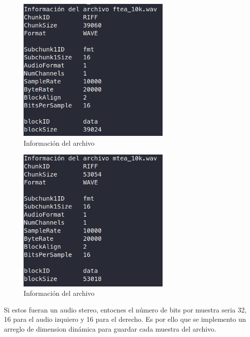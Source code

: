 \begin{minipage}{8.2cm}
    \begin{figure}[H]
        \centering
        \includegraphics[width=7.5cm]{Graphics/ftea_10k_information.png}
        \caption{Información del archivo }
        \label{fig:ftea_information}
    \end{figure}
\end{minipage}
\hspace{0.5cm}
\begin{minipage}{8.2cm}
    \begin{figure}[H]
        \centering
        \includegraphics[width=7.5cm]{Graphics/mtea_10k_information.png}
        \caption{Información del archivo }
        \label{fig:mtea_information}
    \end{figure}
\end{minipage}

Si estos fueran un audio stereo, entocnes el número de bits por muestra seria 32, 16 para el audio izquiero y 16 para el derecho. Es por ello que se implemento un arreglo de dimension dinámica para guardar cada muestra del archivo.

